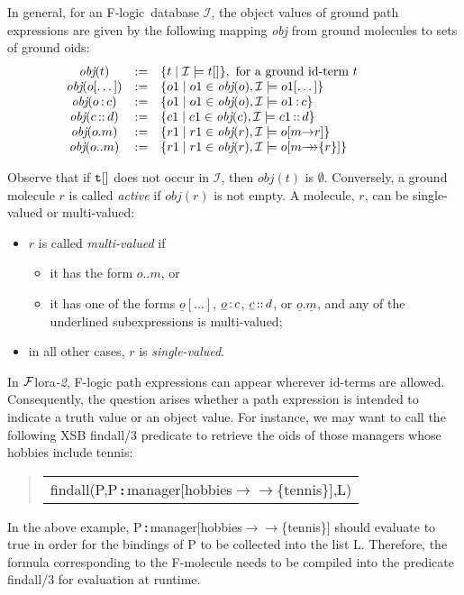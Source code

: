 \documentclass[11pt]{article}
\newenvironment{qrules}{\begin{quote}\sf\begin{tabular}[t]{l}}%
{\end{tabular}\end{quote}}
\newcommand{\obj}{\textit{obj}\xspace}
\newcommand{\db}[1]{\ensuremath{\mathcal{#1}}}
\newcommand{\isa}{\,{\bf{:}}\,}
\newcommand{\subcl}{\,{\bf{::}}\,}
\newcommand{\fd}{\ensuremath{{\rightarrow}}}                   %
\newcommand{\mvd}{\ensuremath{{\rightarrow\!\!\!\!\rightarrow}}}  %
\newcommand{\FLORA}{{\mbox{${\cal F}${\sc lora}\rm\emph{-2}}}\xspace}
\newcommand{\fl}{\mbox{F-logic}\xspace}
\begin{document}
In general, for an \fl\ database \db I, the object values of ground
path expressions are given by the following mapping \obj from ground molecules
to sets of ground oids:
%
\begin{displaymath}
  \begin{array}{cll@{\hspace{4em}}c}
    \obj(t) & := & \{t \mid  \db I\models t[] \}, 
     \textrm{ for a ground id-term $t$}  \\   
    \obj(o[\dots]) & := & \{o1 \mid o1\in\obj(o), \db I \models o1[\dots]
    \} \\  
    \obj(o\isa c) & := & \{o1 \mid o1\in\obj(o), \db I \models o1\isa c\}
     \\ 
    \obj(c\subcl d) & := & \{c1 \mid c1\in\obj(c), \db I \models c1\subcl
    d\} \\ 
    \obj(o.m) & :=  & \{r1 \mid r1\in\obj(r), \db I \models o[m\fd
    r]\} \\ 
    \obj(o..m) & := &  \{r1 \mid  r1\in\obj(r), \db I \models
    o[m{\mvd}\{r\}] \}
  \end{array}
\end{displaymath}

Observe that if $\tt t[]$ does not occur in \db{I}, then $\obj(t)$ is
$\emptyset$.  Conversely, a ground molecule $r$ is called \emph{active} if
$\obj(r)$ is not empty. A molecule, $r$, can be 
single-valued or multi-valued:
\begin{itemize}
\item $r$ is called \emph{multi-valued} if
 \begin{itemize}
  \item it has the form $o..m$, or 
  \item it has one of the forms $\underline{o}[\dots]$,
    $\underline{o}\isa c$, $\underline{c}\subcl d$, or
    $\underline{o}.\underline{m}$, and any of the underlined
    subexpressions is multi-valued;
 \end{itemize}
\item in all other cases, $r$ is \emph{single-valued}.
\end{itemize}

In \FLORA, \fl path expressions can appear wherever id-terms are
allowed. Consequently, the question arises whether a path expression
is intended to indicate a truth value or an object value. For
instance, we may want to call the following XSB {\sf findall/3}
predicate to retrieve the oids of those managers whose hobbies include
tennis:
\begin{qrules}
findall(P,P{\isa}manager[hobbies{\mvd}\{tennis\}],L)
\end{qrules}
In the above example, {\sf P{\isa}manager[hobbies{\mvd}\{tennis\}]}
should evaluate to true in order for the bindings of {\sf P} to be
collected into the list {\sf L}. Therefore, the formula corresponding
to the F-molecule needs to be compiled into the predicate
{\sf findall/3} for evaluation at runtime.
\end{document}

